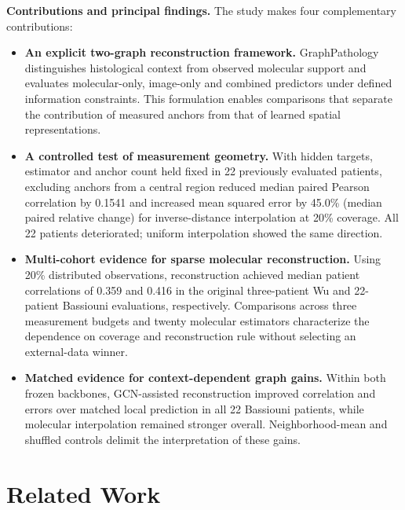 \noindent\textbf{Contributions and principal findings.}
The study makes four complementary contributions:
\begin{itemize}
\item \textbf{An explicit two-graph reconstruction framework.} GraphPathology distinguishes histological context from observed molecular support and evaluates molecular-only, image-only and combined predictors under defined information constraints. This formulation enables comparisons that separate the contribution of measured anchors from that of learned spatial representations.
\item \textbf{A controlled test of measurement geometry.} With hidden targets, estimator and anchor count held fixed in 22 previously evaluated patients, excluding anchors from a central region reduced median paired Pearson correlation by 0.1541 and increased mean squared error by 45.0\% (median paired relative change) for inverse-distance interpolation at 20\% coverage. All 22 patients deteriorated; uniform interpolation showed the same direction.
\item \textbf{Multi-cohort evidence for sparse molecular reconstruction.} Using 20\% distributed observations, reconstruction achieved median patient correlations of 0.359 and 0.416 in the original three-patient Wu and 22-patient Bassiouni evaluations, respectively. Comparisons across three measurement budgets and twenty molecular estimators characterize the dependence on coverage and reconstruction rule without selecting an external-data winner.
\item \textbf{Matched evidence for context-dependent graph gains.} Within both frozen backbones, GCN-assisted reconstruction improved correlation and errors over matched local prediction in all 22 Bassiouni patients, while molecular interpolation remained stronger overall. Neighborhood-mean and shuffled controls delimit the interpretation of these gains.
\end{itemize}

\section{Related Work}
\label{sec:related_work}

